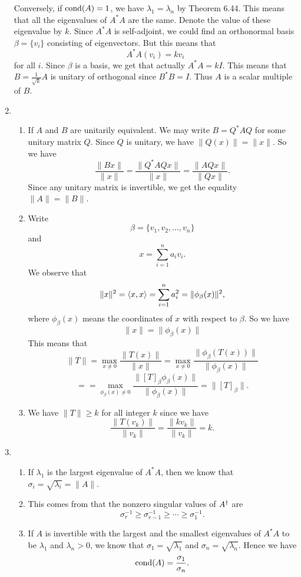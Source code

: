 \begin{enumerate}
Conversely, if $\operatorname{cond}(A)=1$, we have $\lambda_1=\lambda_n$ by Theorem 6.44. This means that all the eigenvalues of $A^*A$ are the same. Denote the value of these eigenvalue by $k$. Since $A^*A$ is self-adjoint, we could find an orthonormal basis $\beta=\{v_i\}$ consisting of eigenvectors. But this means that 
\[A^*A(v_i)=kv_i\]
for all $i$. Since $\beta$ is a basis, we get that actually $A^*A=kI$. This means that $B=\frac{1}{\sqrt{k}}A$ is unitary of orthogonal since $B^*B=I$. Thus $A$ is a scalar multiple of $B$.
\item \begin{enumerate}
\item If $A$ and $B$ are unitarily equivalent. We may write $B=Q^*AQ$ for some unitary matrix $Q$. Since $Q$ is unitary, we have $\|Q(x)\|=\|x\|$. So we have 
\[\frac{\|Bx\|}{\|x\|}=\frac{\|Q^*AQx\|}{\|x\|}=\frac{\|AQx\|}{\|Qx\|}.\]
Since any unitary matrix is invertible, we get the equality $\|A\|=\|B\|$.
\item Write 
\[\beta=\{v_1,v_2,\ldots ,v_n\}\] and 
\[x=\sum_{i=1}^n{a_iv_i}.\]
We observe that 
\[\|x\|^2=\langle x,x\rangle=\sum_{i=1}^n{a_i^2}=\|\phi_{\beta}(x)\|^2,\]
where $\phi_{\beta}(x)$ means the coordinates of $x$ with respect to $\beta$. So we have 
\[\|x\|=\|\phi_{\beta}(x)\|\]
This means that 
\[\|T\|=\max_{x\neq 0}{\frac{\|T(x)\|}{\|x\|}}=\max_{x\neq 0}{\frac{\|\phi_{\beta}(T(x))\|}{\|\phi_{\beta}(x)\|}}\]
\[==\max_{\phi_{\beta}(x)\neq 0}{\frac{\|[T]_{\beta}\phi_{\beta}(x)\|}{\|\phi_{\beta}(x)\|}}=\|[T]_{\beta}\|.\]
\item We have $\|T\|\geq k$ for all integer $k$ since we have 
\[\frac{\|T(v_k)\|}{\|v_k\|}=\frac{\|kv_k\|}{\|v_k\|}=k.\]
\end{enumerate}
\item \begin{enumerate}
\item If $\lambda_1$ is the largest eigenvalue of $A^*A$, then we know that $\sigma_i=\sqrt{\lambda_i}=\|A\|$.
\item This comes from that the nonzero singular values of $A^{\dagger}$ are 
\[\sigma_r^{-1}\geq \sigma_{r-1}^{-1}\geq \cdots \geq \sigma_1^{-1}.\]
\item If $A$ is invertible with the largest and the smallest eigenvalues of $A^*A$ to be $\lambda_1$ and $\lambda_n>0$, we know that $\sigma_1=\sqrt{\lambda_1}$ and $\sigma_n=\sqrt{\lambda_n}$. Hence we have 
\[\operatorname{cond}(A)=\frac{\sigma_1}{\sigma_n}.\]
\end{enumerate}
\end{enumerate}